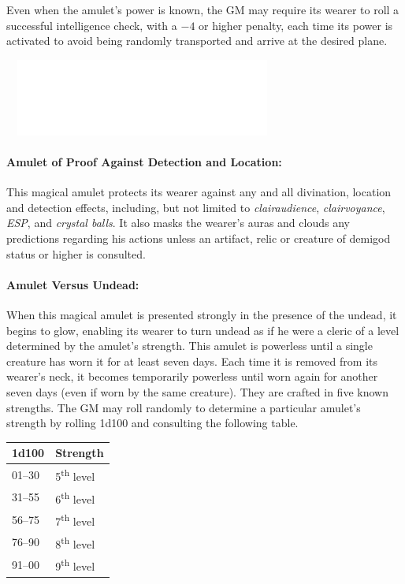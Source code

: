 \begin{multicols}{2}
Even when the amulet's power is known, the GM may require its wearer to roll a successful intelligence check, with a $-4$ or higher penalty, each time its power is activated to avoid being randomly transported and arrive at the desired plane.

\noindent\includegraphics[width=3.6in, height=1in]{testblock.pdf}

\paragraph{Amulet of Proof Against Detection and Location:} This magical amulet protects its wearer against any and all divination, location and detection effects, including, but not limited to \textit{clairaudience}, \textit{clairvoyance}, \textit{ESP}, and \textit{crystal balls}.  It also masks the wearer's auras and clouds any predictions regarding his actions unless an artifact, relic or creature of demigod status or higher is consulted.

\paragraph{Amulet Versus Undead:} When this magical amulet is presented strongly in the presence of the undead, it begins to glow, enabling its wearer to turn undead as if he were a cleric of a level determined by the amulet's strength.  This amulet is powerless until a single creature has worn it for at least seven days.  Each time it is removed from its wearer's neck, it becomes temporarily powerless until worn again for another seven days (even if worn by the same creature).  They are crafted in five known strengths.  The GM may roll randomly to determine a particular amulet's strength by rolling 1d100 and consulting the following table.

\noindent
\begin{tabular}{|p{}|p{}|}
\hline
1d100	& Strength \\
\hline\hline
\rowcolor[gray]{.9}01--30	& 5\textsuperscript{th} level \\
31--55	& 6\textsuperscript{th} level \\
\rowcolor[gray]{.9}56--75	& 7\textsuperscript{th} level \\
76--90	& 8\textsuperscript{th} level \\
\rowcolor[gray]{.9}91--00	& 9\textsuperscript{th} level \\
\hline
\end{tabular}


\end{multicols}
